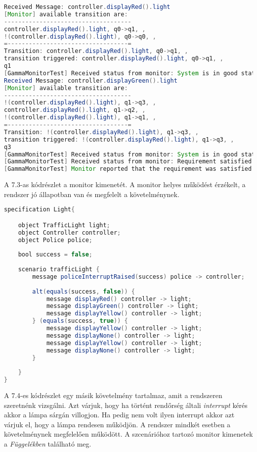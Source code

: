 \begin{lstlisting}[language=java, frame=single, float=ht!, caption={Monitor kimenete.},captionpos=b]
Received Message: controller.displayRed().light
[Monitor] available transition are: 
------------------------------------
controller.displayRed().light, q0->q1, , 
!(controller.displayRed().light), q0->q0, , 
=----------------------------------=
Transition: controller.displayRed().light, q0->q1, , 
transition triggered: controller.displayRed().light, q0->q1, , 
q1
[GammaMonitorTest] Received status from monitor: System is in good state.
Received Message: controller.displayGreen().light
[Monitor] available transition are: 
------------------------------------
!(controller.displayRed().light), q1->q3, , 
controller.displayRed().light, q1->q2, , 
!(controller.displayRed().light), q1->q1, , 
=----------------------------------=
Transition: !(controller.displayRed().light), q1->q3, , 
transition triggered: !(controller.displayRed().light), q1->q3, , 
q3
[GammaMonitorTest] Received status from monitor: System is in good state.
[GammaMonitorTest] Received status from monitor: Requirement satisfied
[GammaMonitorTest] Monitor reported that the requirement was satisfied
\end{lstlisting}

A 7.3-as kódrészlet a monitor kimenetét.
A monitor helyes működést érzékelt, a rendszer jó állapotban van és megfelelt a követelménynek.

\begin{lstlisting}[language=java, frame=single, float=ht!, caption={Szenárió szöveges leírása.},captionpos=b]
specification Light{

    object TrafficLight light;
    object Controller controller;
    object Police police;
    
    bool success = false;
    
    scenario trafficLight {
        message policeInterruptRaised(success) police -> controller;
        
        alt(equals(success, false)) {
            message displayRed() controller -> light;
            message displayGreen() controller -> light;
            message displayYellow() controller -> light;
        } (equals(success, true)) {
            message displayYellow() controller -> light;
            message displayNone() controller -> light;
            message displayYellow() controller -> light;
            message displayNone() controller -> light;
        }
        
    }
}
\end{lstlisting}

A 7.4-es kódrészlet egy másik követelmény tartalmaz, amit a rendszeren szeretnénk vizsgálni.
Azt várjuk, hogy ha történt rendőrség általi \textit{interrupt} kérés akkor a lámpa sárgán villogjon.
Ha pedig nem volt ilyen interrupt akkor azt várjuk el, hogy a lámpa rendesen működjön.
A rendszer mindkét esetben a követelménynek megfelelően működött.
A szcenárióhoz tartozó monitor kimenetek a \textit{Függelékben} található meg.